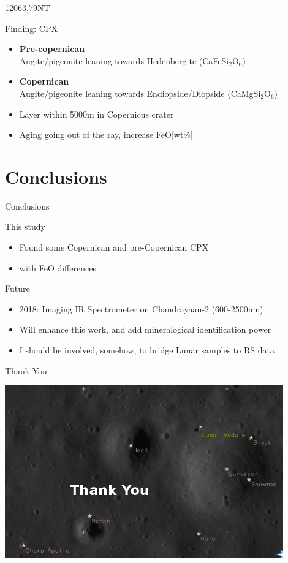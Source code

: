 \documentclass[unknownkeysallowed,xcolor=dvipsnames,beamer]{beamer} %
\begin{document}
\begin{frame}[fragile]{12063,79NT}
\begin{block}{Finding: CPX}
\begin{itemize}
\item \textbf{Pre-copernican}\\
Augite/pigeonite leaning towards Hedenbergite (CaFeSi$_2$O$_6$)
\item \textbf{Copernican}\\
Augite/pigeonite leaning towards Endiopside/Diopside (CaMgSi$_2$O$_6$)
\item Layer within 5000m in Copernicus crater
\item Aging going out of the ray, increase FeO[wt\%]
\end{itemize}
\end{block}
\end{frame}

\section{Conclusions}
\begin{frame}[fragile]{Conclusions}
\begin{block}{This study}
\begin{itemize}
\item Found some Copernican and pre-Copernican CPX
\item with FeO differences
\end{itemize}
\end{block}
\begin{block}{Future}
\begin{itemize}
\item 2018: Imaging IR Spectrometer on Chandrayaan-2 (600-2500nm)
\item Will enhance this work, and add mineralogical identification power 
\item I should be involved, somehow, to bridge Lunar samples to RS data
\end{itemize}
\end{block}
\end{frame}

\begin{frame}[fragile]{Thank You}
\begin{center}
  \includegraphics[width=12cm]{images/fig1_small}
\end{center}
\end{frame}
\end{document}
